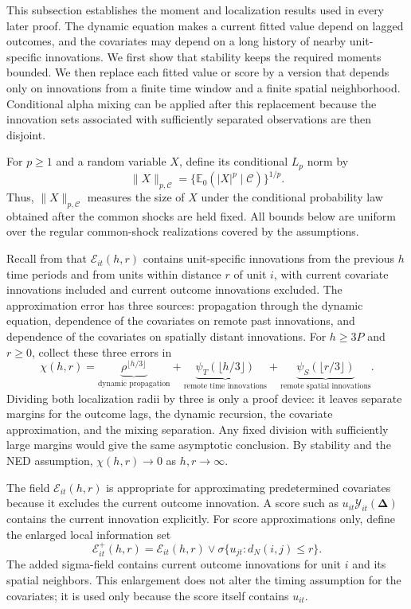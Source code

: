 \documentclass[11pt]{article}
\numberwithin{equation}{section}
\theoremstyle{remark}
\newcommand{\Ezero}{\mathbb E_0}
\newcommand{\bDelta}{\bm\Delta}
\begin{document}
This subsection establishes the moment and localization results used in every later proof. The dynamic equation makes a current fitted value depend on lagged outcomes, and the covariates may depend on a long history of nearby unit-specific innovations. We first show that stability keeps the required moments bounded. We then replace each fitted value or score by a version that depends only on innovations from a finite time window and a finite spatial neighborhood. Conditional alpha mixing can be applied after this replacement because the innovation sets associated with sufficiently separated observations are then disjoint.

For $p\ge1$ and a random variable $X$, define its conditional $L_p$ norm by
$$
\|X\|_{p,\mathscr C}
=
\{\Ezero(|X|^p\mid\mathscr C)\}^{1/p}.
$$
Thus, $\|X\|_{p,\mathscr C}$ measures the size of $X$ under the conditional probability law obtained after the common shocks are held fixed. All bounds below are uniform over the regular common-shock realizations covered by the assumptions.

Recall from  that $\mathscr E_{it}(h,r)$ contains unit-specific innovations from the previous $h$ time periods and from units within distance $r$ of unit $i$, with current covariate innovations included and current outcome innovations excluded. The approximation error has three sources: propagation through the dynamic equation, dependence of the covariates on remote past innovations, and dependence of the covariates on spatially distant innovations. For $h\ge3P$ and $r\ge0$, collect these three errors in
$$
\chi(h,r)
=
\underbrace{\rho^{\lfloor h/3\rfloor}}_{\text{dynamic propagation}}
+
\underbrace{\psi_T(\lfloor h/3\rfloor)}_{\text{remote time innovations}}
+
\underbrace{\psi_S(\lfloor r/3\rfloor)}_{\text{remote spatial innovations}}.
$$
Dividing both localization radii by three is only a proof device: it leaves separate margins for the outcome lags, the dynamic recursion, the covariate approximation, and the mixing separation. Any fixed division with sufficiently large margins would give the same asymptotic conclusion. By stability and the NED assumption, $\chi(h,r)\to0$ as $h,r\to\infty$.

The field $\mathscr E_{it}(h,r)$ is appropriate for approximating predetermined covariates because it excludes the current outcome innovation. A score such as $u_{it}\mathcal Y_{it}(\bDelta)$ contains the current innovation explicitly. For score approximations only, define the enlarged local information set
$$
\mathscr E_{it}^{+}(h,r)
=
\mathscr E_{it}(h,r)
\vee
\sigma\{u_{jt}:d_N(i,j)\le r\}.
$$
The added sigma-field contains current outcome innovations for unit $i$ and its spatial neighbors. This enlargement does not alter the timing assumption for the covariates; it is used only because the score itself contains $u_{it}$.
\end{document}
